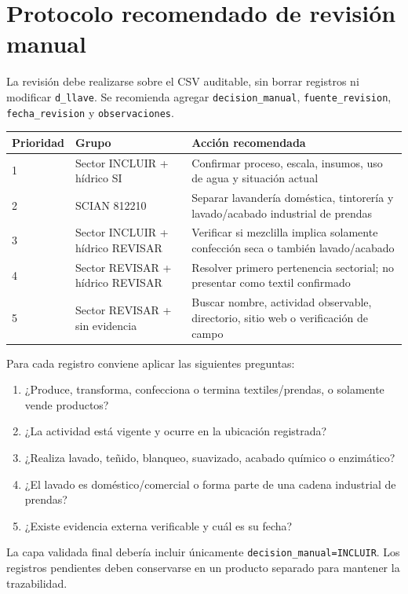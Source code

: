 \documentclass[11pt,letterpaper]{article}
\begin{document}
\section{Protocolo recomendado de revisión manual}

La revisión debe realizarse sobre el CSV auditable, sin borrar registros ni modificar \texttt{d\_llave}. Se recomienda agregar \texttt{decision\_manual}, \texttt{fuente\_revision}, \texttt{fecha\_revision} y \texttt{observaciones}.

\begin{longtable}{p{}p{}p{}}
\toprule
Prioridad & Grupo & Acción recomendada\\
\midrule
\endhead
1 & Sector INCLUIR + hídrico SI & Confirmar proceso, escala, insumos, uso de agua y situación actual\\
2 & SCIAN 812210 & Separar lavandería doméstica, tintorería y lavado/acabado industrial de prendas\\
3 & Sector INCLUIR + hídrico REVISAR & Verificar si mezclilla implica solamente confección seca o también lavado/acabado\\
4 & Sector REVISAR + hídrico REVISAR & Resolver primero pertenencia sectorial; no presentar como textil confirmado\\
5 & Sector REVISAR + sin evidencia & Buscar nombre, actividad observable, directorio, sitio web o verificación de campo\\
\bottomrule
\end{longtable}

Para cada registro conviene aplicar las siguientes preguntas:

\begin{enumerate}
  \item ¿Produce, transforma, confecciona o termina textiles/prendas, o solamente vende productos?
  \item ¿La actividad está vigente y ocurre en la ubicación registrada?
  \item ¿Realiza lavado, teñido, blanqueo, suavizado, acabado químico o enzimático?
  \item ¿El lavado es doméstico/comercial o forma parte de una cadena industrial de prendas?
  \item ¿Existe evidencia externa verificable y cuál es su fecha?
\end{enumerate}

La capa validada final debería incluir únicamente \texttt{decision\_manual=INCLUIR}. Los registros pendientes deben conservarse en un producto separado para mantener la trazabilidad.
\end{document}
